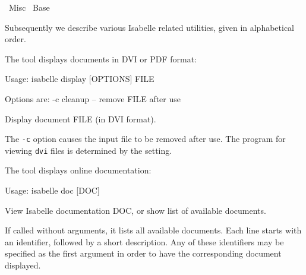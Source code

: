 %
\begin{isabellebody}%
\def\isabellecontext{Misc}%
%
\isadelimtheory
%
\endisadelimtheory
%
\isatagtheory
{}\isamarkupfalse%
\ Misc\isanewline
{}\ Base\isanewline
{}%
\endisatagtheory
{\isafoldtheory}%
%
\isadelimtheory
%
\endisadelimtheory
%
\isamarkuptrue%
%
\begin{isamarkuptext}%
Subsequently we describe various Isabelle related utilities, given
  in alphabetical order.%
\end{isamarkuptext}%
\isamarkuptrue%
%
\isamarkuptrue%
%
\begin{isamarkuptext}%
The \hypertarget{tool.display}{\hyperlink{tool.display}{\mbox{}}} tool displays documents in DVI or PDF
  format:
\begin{ttbox}
Usage: isabelle display [OPTIONS] FILE

  Options are:
    -c           cleanup -- remove FILE after use

  Display document FILE (in DVI format).
\end{ttbox}

  \medskip The \verb|-c| option causes the input file to be
  removed after use.  The program for viewing \verb|dvi| files is
  determined by the \hyperlink{setting.DVI-VIEWER}{\mbox{}} setting.%
\end{isamarkuptext}%
\isamarkuptrue%
%
\isamarkuptrue%
%
\begin{isamarkuptext}%
The \hypertarget{tool.doc}{\hyperlink{tool.doc}{\mbox{}}} tool displays online documentation:
\begin{ttbox}
Usage: isabelle doc [DOC]

  View Isabelle documentation DOC, or show list of available documents.
\end{ttbox}
  If called without arguments, it lists all available documents. Each
  line starts with an identifier, followed by a short description. Any
  of these identifiers may be specified as the first argument in order
  to have the corresponding document displayed.


\end{isamarkuptext}
\end{isabellebody}
